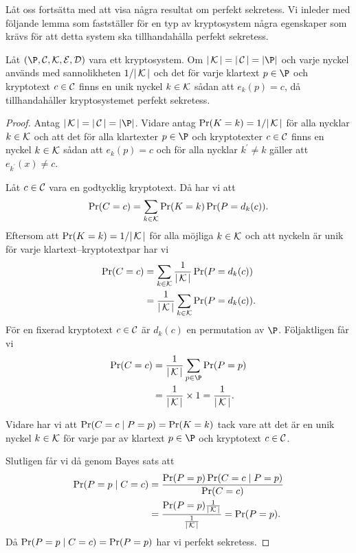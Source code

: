 Låt oss fortsätta med att visa några resultat om perfekt sekretess.
Vi inleder med följande lemma som fastställer för en typ av kryptosystem några 
egenskaper som krävs för att detta system ska tillhandahålla perfekt sekretess.
\begin{lemma}\label{lem:perfectSecrecy}
  Låt \((\P,\C,\K,\E,\D)\) vara ett kryptosystem.
  Om \(|\K| = |\C| = |\P|\) och varje nyckel används med sannolikheten 
  \(1/|\operatorname{\mathcal{K}}|\) och det för varje klartext \(p\in \P\) och kryptotext \(c\in \operatorname{\mathcal{C}}\) 
  finns en unik nyckel \(k\in \operatorname{\mathcal{K}}\) sådan att \(e_k(p) = c\), då tillhandahåller 
  kryptosystemet perfekt sekretess.
\end{lemma}
\begin{proof}
  Antag \(|\K| = |\C| = |\P|\).
  Vidare antag \(\Pr(\relax{K} = k) = 1/|\operatorname{\mathcal{K}}|\) för alla nycklar \(k\in \operatorname{\mathcal{K}}\) och att 
  det för alla klartexter \(p\in \P\) och kryptotexter \(c\in \operatorname{\mathcal{C}}\) finns en 
  nyckel \(k\in \operatorname{\mathcal{K}}\) sådan att \(e_k(p) = c\) och för alla nycklar 
  \(k^\prime\neq k\) gäller att \(e_{k^\prime}(x)\neq c\).

  Låt \(c\in \operatorname{\mathcal{C}}\) vara en godtycklig kryptotext.
  Då har vi att
  \begin{align}
    \nonumber
    \Pr(\relax{C} = c) = \sum_{k\in \operatorname{\mathcal{K}}}\Pr(\relax{K} = k)\Pr(\relax{P} = d_k(c)).
  \end{align}
  Eftersom att \(\Pr(\relax{K} = k) = 1/|\operatorname{\mathcal{K}}|\) för alla möjliga \(k\in \operatorname{\mathcal{K}}\) och att 
  nyckeln är unik för varje klartext--kryptotextpar har vi
  \begin{align}
    \nonumber
    \Pr(\relax{C} = c) &= \sum_{k\in \operatorname{\mathcal{K}}}\frac{1}{|\operatorname{\mathcal{K}}|}\Pr(\relax{P} = d_k(c)) \\
    \nonumber
      &= \frac{1}{|\operatorname{\mathcal{K}}|}\sum_{k\in \operatorname{\mathcal{K}}} \Pr(\relax{P} = d_k(c)).
  \end{align}
  För en fixerad kryptotext \(c\in \operatorname{\mathcal{C}}\) är \(d_k(c)\) en permutation av \(\P\).
  Följaktligen får vi
  \begin{align}
    \nonumber
    \Pr(\c = c) &= \frac{1}{|\K|}\sum_{p\in \P} \Pr(\p = p) \\
    \nonumber
      &= \frac{1}{|\K|}\times 1 = \frac{1}{|\K|}.
  \end{align}

  Vidare har vi att \(\Pr(\relax{C} = c\mid \relax{P} = p) = \Pr(\relax{K} = k)\) tack vare att det 
  är en unik nyckel \(k\in \operatorname{\mathcal{K}}\) för varje par av klartext \(p\in \P\) och 
  kryptotext \(c\in \operatorname{\mathcal{C}}\).

  Slutligen får vi då genom Bayes sats att
  \begin{align}
    \nonumber
    \Pr(\relax{P} = p\mid \relax{C} = c) &= \frac{\Pr(\relax{P} = p)\Pr(\relax{C} = c\mid \relax{P} = p)}{\Pr(\relax{C} 
    = c)} \\
    \nonumber
      &= \frac{\Pr(\relax{P} = p)\frac{1}{|\operatorname{\mathcal{K}}|}}{\frac{1}{|\operatorname{\mathcal{K}}|}} = \Pr(\relax{P} = p).
  \end{align}
  Då \(\Pr(\relax{P} = p\mid \relax{C} = c) = \Pr(\relax{P} = p)\) har vi perfekt sekretess.
\end{proof}

